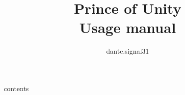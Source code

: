 \documentclass{ol-softwaremanual}
\title{Prince of Unity \\Usage manual}
\author{dante.signal31}
\begin{document}
\maketitle

\tableofcontents

{{ contents }}
\end{document}
